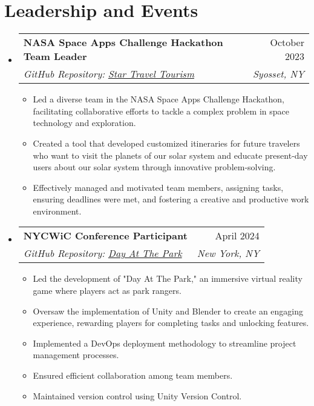 \documentclass[letterpaper,11pt]{article}
\makeatletter
\newcommand{\resumeItem}[1]{
  \item\small{
    {#1 \vspace{-2pt}}
  }
}
\newcommand{\resumeSubheading}[4]{
  \vspace{-2pt}\item
    \begin{tabular*}{0.97\textwidth}[t]{l@{\extracolsep{\fill}}r}
      \textbf{#1} & #2 \\
      \textit{\small#3} & \textit{\small #4} \\
    \end{tabular*}\vspace{-7pt}
}
\newcommand{\resumeSubHeadingListStart}{\begin{itemize}[leftmargin=0.15in, label={}]}
\newcommand{\resumeSubHeadingListEnd}{\end{itemize}}
\newcommand{\resumeItemListStart}{\begin{itemize}}
\newcommand{\resumeItemListEnd}{\end{itemize}\vspace{-5pt}}
\makeatother
\begin{document}

\section{Leadership and Events}
  \resumeSubHeadingListStart

    \resumeSubheading
      {NASA Space Apps Challenge Hackathon Team Leader}{October 2023}
      {GitHub Repository: \href{https://github.com/ShaniaB417/Star-Travel-Tourism}{Star Travel Tourism}}{Syosset, NY}
      \resumeItemListStart
        \resumeItem{Led a diverse team in the NASA Space Apps Challenge Hackathon, facilitating collaborative efforts to tackle a complex problem in space technology and exploration.}
        \resumeItem{Created a tool that developed customized itineraries for future travelers who want to visit the planets of our solar system and educate present-day users about our solar system through innovative problem-solving.}
        \resumeItem{Effectively managed and motivated team members, assigning tasks, ensuring deadlines were met, and fostering a creative and productive work environment.}
      \resumeItemListEnd
    
    \resumeSubheading
      {NYCWiC Conference Participant}{April 2024}
      {GitHub Repository: \href{https://github.com/ShaniaB417/Day-At-The-Park}{Day At The Park}}{New York, NY}
      \resumeItemListStart
        \resumeItem{Led the development of "Day At The Park," an immersive virtual reality game where players act as park rangers.}
        \resumeItem{Oversaw the implementation of Unity and Blender to create an engaging experience, rewarding players for completing tasks and unlocking features.}
        \resumeItem{Implemented a DevOps deployment methodology to streamline project management processes.}
        \resumeItem{Ensured efficient collaboration among team members.}
        \resumeItem{Maintained version control using Unity Version Control.}
      \resumeItemListEnd
    
  \resumeSubHeadingListEnd
    
\end{document}
